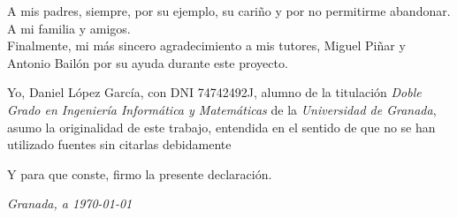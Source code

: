 \newpage


\thispagestyle{empty}

\quad

\newpage

\thispagestyle{empty}

\vspace*{2cm}

\begin{flushright}
\parbox{3.5in}
{\small
A mis padres, siempre, por su ejemplo, su cariño y por no permitirme abandonar. \\

A mi familia y amigos. \\

Finalmente, mi más sincero agradecimiento a mis tutores, Miguel Piñar y Antonio Bailón por su ayuda durante este proyecto.}

\end{flushright}

\newpage


Yo, Daniel López García, con DNI 74742492J, alumno de la titulación \emph{Doble Grado en Ingeniería Informática y Matemáticas} de la \emph{Universidad de Granada}, asumo la originalidad de este trabajo, entendida en el sentido de que no se han utilizado fuentes sin citarlas debidamente

Y para que conste, firmo la presente declaración.

\bigskip

\noindent\textit{Granada, a \today} 

\smallskip

